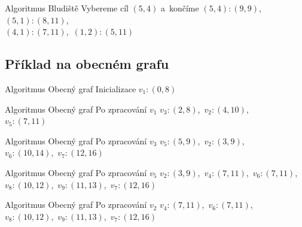 \documentclass[11pt,professionalfont,aspectratio=43]{beamer}
\begin{document}
    \begin{frame}{Algoritmus \Astar}{Bludiště}
    \centering
    \AStarMazeState
        {Vybereme cíl $(5,4)$ a~končíme}
        {$(5,4):(9,9)$,\ $(5,1):(8,11)$,\\[0.5mm]
        $(4,1):(7,11)$,\ $(1,2):(5,11)$}
        {\AStarMazeTreeK}
        {\AStarMazeNodesK}
    \end{frame}

    \subsection{Příklad na obecném grafu}

    \begin{frame}{Algoritmus \Astar}{Obecný graf}
    \centering
    \AStarGraphState
        {Inicializace}
        {$v_1:(0,8)$}
        {\AStarGraphTreeA}
        {\AStarGraphNodesA}
    \end{frame}

    \begin{frame}{Algoritmus \Astar}{Obecný graf}
    \centering
    \AStarGraphState
        {Po zpracování $v_1$}
        {$v_3:(2,8)$,\ $v_2:(4,10)$,\\[0.5mm]
        $v_5:(7,11)$}
        {\AStarGraphTreeB}
        {\AStarGraphNodesB}
    \end{frame}

    \begin{frame}{Algoritmus \Astar}{Obecný graf}
    \centering
    \AStarGraphState
        {Po zpracování $v_3$}
        {$v_5:(5,9)$,\ $v_2:(3,9)$,\\[0.5mm]
        $v_6:(10,14)$,\ $v_7:(12,16)$}
        {\AStarGraphTreeC}
        {\AStarGraphNodesC}
    \end{frame}

    \begin{frame}{Algoritmus \Astar}{Obecný graf}
    \centering
    \AStarGraphState
        {Po zpracování $v_5$}
        {$v_2:(3,9)$,\ $v_4:(7,11)$,\ $v_6:(7,11)$,\\[0.5mm]
        $v_8:(10,12)$,\ $v_9:(11,13)$,\ $v_7:(12,16)$}
        {\AStarGraphTreeD}
        {\AStarGraphNodesD}
    \end{frame}

    \begin{frame}{Algoritmus \Astar}{Obecný graf}
    \centering
    \AStarGraphState
        {Po zpracování $v_2$}
        {$v_4:(7,11)$,\ $v_6:(7,11)$,\\[0.5mm]
        $v_8:(10,12)$,\ $v_9:(11,13)$,\ $v_7:(12,16)$}
        {\AStarGraphTreeE}
        {\AStarGraphNodesE}
    \end{frame}
\end{document}
